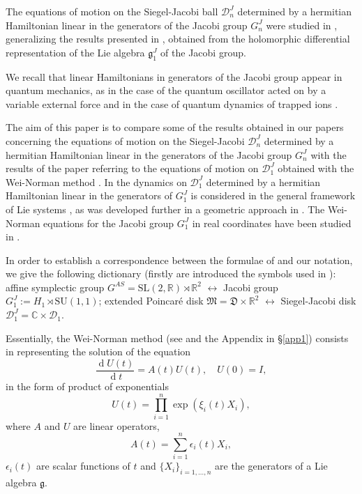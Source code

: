 \documentclass[12pt]{amsart}
\numberwithin{equation}{section}
\theoremstyle{definition}
\begin{document}
The equations of motion on the Siegel-Jacobi ball ${{\mathcal{{D}}}}^J_n$
determined by a hermitian  Hamiltonian   linear in the generators of
the Jacobi group $G^J_n$ were studied in \cite{nou}, generalizing the
results presented  in \cite{jac1,FC},  obtained from the holomorphic differential
representation of the Lie algebra ${{\mathfrak{{g}}}}^J_1$  of the Jacobi group.
 
We recall that linear Hamiltonians in generators of the Jacobi group appear in
  quantum mechanics, as in the case of the  quantum oscillator
acted on by a variable external force \cite{fey,sw,hs} and  in the case of  quantum
dynamics of trapped ions \cite{viorica,ma}.

The aim of this paper is to compare some of the results obtained in
our papers \cite{jac1,FC,nou} concerning the equations of motion  on
the Siegel-Jacobi ${{\mathcal{{D}}}}^J_n$ determined by a hermitian 
Hamiltonian  linear in the generators of the Jacobi group $G^J_n$ with the
results of the paper \cite{cezar} referring to the equations
of motion on ${{\mathcal{{D}}}}^J_1$ obtained with the Wei-Norman method
\cite{wei}. In \cite{cezar} the  dynamics on ${{\mathcal{{D}}}}^J_1$ determined
by a   hermitian  Hamiltonian linear in the generators of $G^J_1$ is considered
in the general framework of Lie systems \cite{lie,lies},  as was  developed
further  in a  geometric approach in \cite{ca1,ca2}. The Wei-Norman
equations for  the  Jacobi group $G^J_1$ in real coordinates have been studied  in
\cite{ca3,ca4}.

In order to establish a correspondence between the formulae of
\cite{cezar} and our notation, we give the following dictionary  (firstly are introduced the symbols used in \cite{cezar}): affine symplectic group $G^{AS}=\text{SL}(2,{\ensuremath{\mathbb{R}}})\rtimes{\ensuremath{\mathbb{R}}}^2$ $\leftrightarrow $ Jacobi group
$G^J_1:=H_1\rtimes \text{SU}(1,1)$; extended Poincar\'e disk ${{\mathfrak{{M}}}}={{\mathfrak{{D}}}}\times{\ensuremath{\mathbb{R}}}^2$ $\leftrightarrow$
Siegel-Jacobi disk ${{\mathcal{{D}}}}^J_1={\ensuremath{\mathbb{C}}}\times{{\mathcal{{D}}}}_1$. 

Essentially, the  Wei-Norman method (see \cite{wei} and the Appendix
in \S\ref{app1}) consists in representing  the solution
of the equation 
$$\frac{{\operatorname{d}} U(t)}{{\operatorname{d}} t}= A(t)U(t), \quad U(0)=I, $$
 in the form of product of exponentials
\begin{equation}\label{tsiL}U(t)=\prod_{i=1}^n\exp(\xi_i(t)X_i),
\end{equation}
 where $A$
and $U$ are linear operators, 
\begin{equation}\label{linA}
A(t)=\sum_{i=1}^n\epsilon_i(t)X_i,\end{equation}  
$\epsilon_i(t)$ are scalar functions of
$t$ and $\{X_i\}_{i=1,\dots,n}$ are the generators of a Lie algebra ${{\mathfrak{{g}}}}$. 
\end{document}
